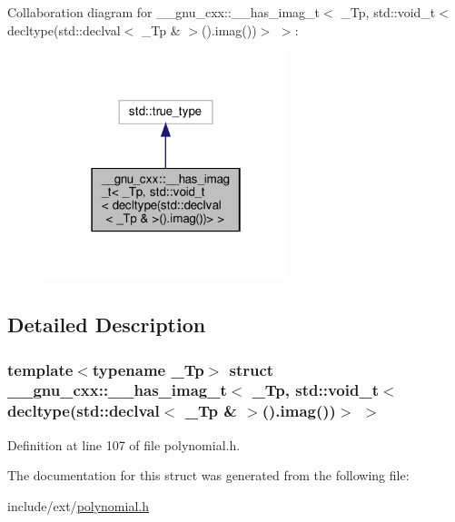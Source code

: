 Collaboration diagram for \+\_\+\+\_\+gnu\+\_\+cxx\+:\+:\+\_\+\+\_\+has\+\_\+imag\+\_\+t$<$ \+\_\+\+Tp, std\+:\+:void\+\_\+t$<$ decltype(std\+:\+:declval$<$ \+\_\+\+Tp \& $>$().imag())$>$ $>$\+:
\nopagebreak
\begin{figure}[H]
\begin{center}
\leavevmode
\includegraphics[width=202pt]{struct____gnu__cxx_1_1____has__imag__t_3_01__Tp_00_01std_1_1void__t_3_01decltype_07std_1_1declva76c1ac43224ce0c47cb3099336023b94}
\end{center}
\end{figure}


\subsection{Detailed Description}
\subsubsection*{template$<$typename \+\_\+\+Tp$>$\newline
struct \+\_\+\+\_\+gnu\+\_\+cxx\+::\+\_\+\+\_\+has\+\_\+imag\+\_\+t$<$ \+\_\+\+Tp, std\+::void\+\_\+t$<$ decltype(std\+::declval$<$ \+\_\+\+Tp \& $>$().\+imag())$>$ $>$}



Definition at line 107 of file polynomial.\+h.



The documentation for this struct was generated from the following file\+:\begin{DoxyCompactItemize}
\item 
include/ext/\hyperlink{polynomial_8h}{polynomial.\+h}\end{DoxyCompactItemize}
